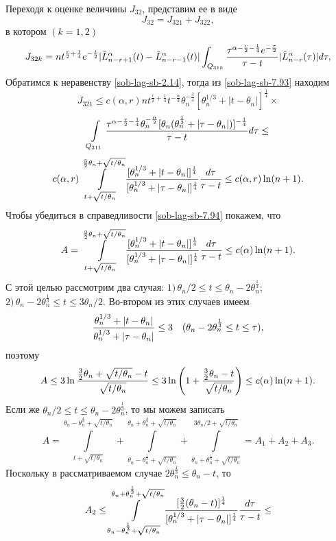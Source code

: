 Переходя к оценке величины $J_{32}$, представим ее в виде
\begin{equation}\label{sob-lag-sb-7.92}
J_{32}=J_{321}+J_{322},
\end{equation}
в котором $(k=1,2)$
\begin{equation}\label{sob-lag-sb-7.93}
J_{32k}=nt^{\frac{r}{2}+\frac14}e^{-\frac{t}{2}}|\hat L_{n-r+1}^\alpha(t)-\hat L_{n-r-1}^\alpha(t)|\int_{Q_{31k}}{\tau^{\alpha-\frac{r}{2}-\frac14}e^{-\frac{\tau}{2}}\over \tau-t}|\hat L_{n-r}^\alpha(\tau)|d\tau,
\end{equation}
 Обратимся  к неравенству \eqref{sob-lag-sb-2.14}, тогда из  \eqref{sob-lag-sb-7.93} находим
$$
J_{321}\le c(\alpha,r)nt^{\frac{r}{2}+\frac14}t^{-\frac\alpha2}\theta_n^{-\frac34}[\theta_n^{1/3}+|t-\theta_n|]^\frac14\times $$
$$
\int\limits_{Q_{311}}{\tau^{\alpha-\frac{r}{2}-\frac14}\theta_n^{-\frac\alpha2}[\theta_n(\theta_n^{\frac13}+|\tau-\theta_n|)]^{-\frac14}\over \tau-t}d\tau\le
$$
\begin{equation}\label{sob-lag-sb-7.94}
c(\alpha,r)\int\limits_{t+\sqrt{t/\theta_n}}^{\frac{3}{2}\theta_n+\sqrt{t/\theta_n}}{[\theta_n^{1/3}+|t-\theta_n|]^\frac14\over
[\theta_n^{1/3}+|\tau-\theta_n|]^\frac14}
{d\tau\over \tau-t}\le c(\alpha,r)\ln(n+1).
\end{equation}
Чтобы убедиться в справедливости \eqref{sob-lag-sb-7.94} покажем, что
$$
A=\int\limits_{t+\sqrt{t/\theta_n}}^{\frac{3}{2}\theta_n+\sqrt{t/\theta_n}}{[\theta_n^{1/3}+|t-\theta_n|]^\frac14\over
[\theta_n^{1/3}+|\tau-\theta_n|]^\frac14} {d\tau\over \tau-t}\le c(\alpha)\ln(n+1).
$$
С этой целью рассмотрим два случая: $1)\, \theta_n/2\le t\le \theta_n-2\theta_n^\frac13$; $2)\, \theta_n-2\theta_n^\frac13\le t\le 3\theta_n/2$. Во-втором из этих случаев имеем
 $$
{\theta_n^{1/3}+|t-\theta_n|\over \theta_n^{1/3}+|\tau-\theta_n|}\le 3 \quad (\theta_n-2\theta_n^\frac13\le t\le \tau),
$$
поэтому
$$
A\le 3 \ln{\frac{3}{2}\theta_n+\sqrt{t/\theta_n}-t\over\sqrt{t/\theta_n} }\le
3\ln \left(1+{\frac{3}{2}\theta_n-t\over\sqrt{t/\theta_n}} \right)\le c(\alpha)\ln(n+1).
$$
Если же $\theta_n/2\le t\le \theta_n-2\theta_n^\frac13$, то мы можем записать
$$
A=\int\limits_{t+\sqrt{t/\theta_n}}^{\theta_n-\theta_n^\frac13+\sqrt{t/\theta_n}}+
\int\limits_{\theta_n-\theta_n^\frac13+\sqrt{t/\theta_n}}^{\theta_n+\theta_n^\frac13+
\sqrt{t/\theta_n}}+
\int\limits_{\theta_n+\theta_n^\frac13+\sqrt{t/\theta_n}}^{3\theta_n/2+\sqrt{t/\theta_n}}=A_1+A_2+A_3.
$$
Поскольку в рассматриваемом случае $2\theta_n^\frac13\le\theta_n-t$, то
$$
A_2\le\int\limits_{\theta_n-\theta_n^\frac13+\sqrt{t/\theta_n}}^{\theta_n+
\theta_n^\frac13+\sqrt{t/\theta_n}}
{[\frac32(\theta_n-t)]^\frac14\over[\theta_n^{1/3}+|\tau-\theta_n|]^\frac14} {d\tau\over \tau-t}\le
$$

